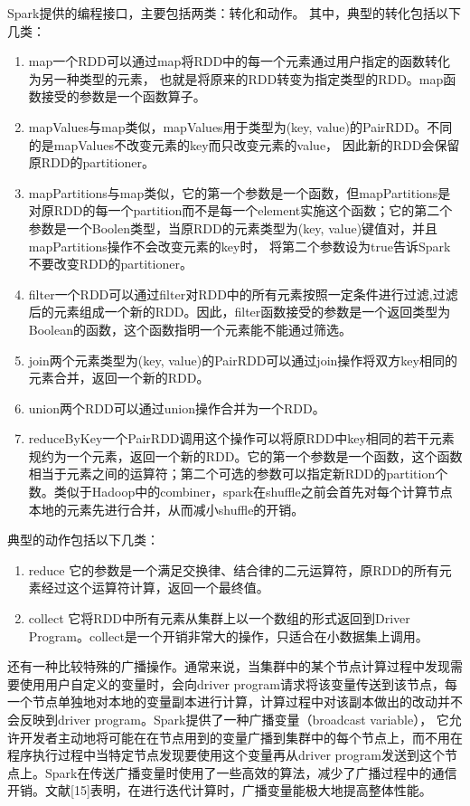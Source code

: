 \documentclass[master]{njuthesis}
\begin{document}
Spark提供的编程接口，主要包括两类：转化和动作。
其中，典型的转化包括以下几类： 
\begin{enumerate}
 \item {\asciifamily map}一个RDD可以通过map将RDD中的每一个元素通过用户指定的函数转化为另一种类型的元素，
 也就是将原来的RDD转变为指定类型的RDD。map函数接受的参数是一个函数算子。
 \item {\asciifamily mapValues}与map类似，mapValues用于类型为(key, value)的PairRDD。不同的是mapValues不改变元素的key而只改变元素的value，
 因此新的RDD会保留原RDD的partitioner。
 \item {\asciifamily mapPartitions}与map类似，它的第一个参数是一个函数，但mapPartitions是对原RDD的每一个partition而不是每一个element实施这个函数；它的第二个参数是一个Boolen类型，当原RDD的元素类型为(key, value)键值对，并且mapPartitions操作不会改变元素的key时，
 将第二个参数设为true告诉Spark不要改变RDD的partitioner。
\item {\asciifamily filter}一个RDD可以通过filter对RDD中的所有元素按照一定条件进行过滤,过滤后的元素组成一个新的RDD。因此，filter函数接受的参数是一个返回类型为Boolean的函数，这个函数指明一个元素能不能通过筛选。
\item {\asciifamily join}两个元素类型为(key, value)的PairRDD可以通过join操作将双方key相同的元素合并，返回一个新的RDD。
\item {\asciifamily union}两个RDD可以通过union操作合并为一个RDD。
\item {\asciifamily reduceByKey}一个PairRDD调用这个操作可以将原RDD中key相同的若干元素规约为一个元素，返回一个新的RDD。它的第一个参数是一个函数，这个函数相当于元素之间的运算符；第二个可选的参数可以指定新RDD的partition个数。类似于Hadoop中的combiner，spark在shuffle之前会首先对每个计算节点本地的元素先进行合并，从而减小shuffle的开销。
\end{enumerate}
典型的动作包括以下几类：
\begin{enumerate}
 \item {\asciifamily reduce} 它的参数是一个满足交换律、结合律的二元运算符，原RDD的所有元素经过这个运算符计算，返回一个最终值。
 \item {\asciifamily collect} 它将RDD中所有元素从集群上以一个数组的形式返回到Driver Program。collect是一个开销非常大的操作，只适合在小数据集上调用。
\end{enumerate}
还有一种比较特殊的广播操作。通常来说，当集群中的某个节点计算过程中发现需要使用用户自定义的变量时，会向driver program请求将该变量传送到该节点，每一个节点单独地对本地的变量副本进行计算，计算过程中对该副本做出的改动并不会反映到driver program。Spark提供了一种广播变量（broadcast variable）， 
它允许开发者主动地将可能在在节点用到的变量广播到集群中的每个节点上，而不用在程序执行过程中当特定节点发现要使用这个变量再从driver program发送到这个节点上。Spark在传送广播变量时使用了一些高效的算法，减少了广播过程中的通信开销。文献[15]表明，在进行迭代计算时，广播变量能极大地提高整体性能。
\fi
\end{document}
